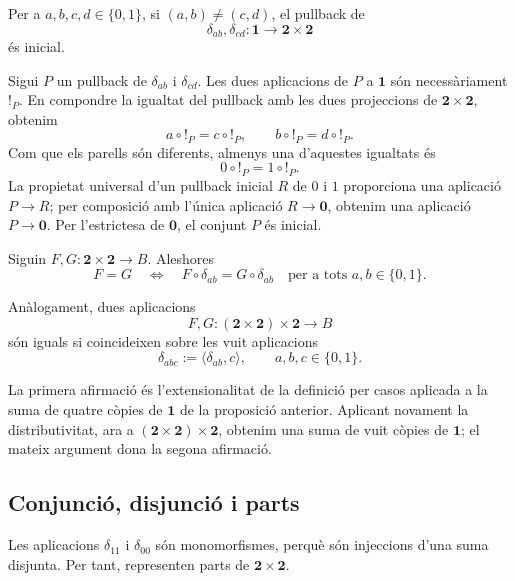 \begin{proposicio}\label{prop:delta-disjuntes}
Per a \(a,b,c,d\in\{0,1\}\), si \((a,b)\neq(c,d)\), el pullback de
\[
\delta_{ab},\delta_{cd}:\mathbf1\to\mathbf2\times\mathbf2
\]
és inicial.
\end{proposicio}

\begin{prova}
Sigui \(P\) un pullback de \(\delta_{ab}\) i \(\delta_{cd}\). Les dues aplicacions de \(P\) a \(\mathbf1\) són necessàriament \({!}_P\). En compondre la igualtat del pullback amb les dues projeccions de \(\mathbf2\times\mathbf2\), obtenim
\[
a\circ {!}_P=c\circ {!}_P,
\qquad
b\circ {!}_P=d\circ {!}_P.
\]
Com que els parells són diferents, almenys una d'aquestes igualtats és
\[
0\circ {!}_P=1\circ {!}_P.
\]
La propietat universal d'un pullback inicial \(R\) de \(0\) i \(1\) proporciona una aplicació \(P\to R\); per composició amb l'única aplicació \(R\to\mathbf0\), obtenim una aplicació \(P\to\mathbf0\). Per l'estrictesa de \(\mathbf0\), el conjunt \(P\) és inicial.
\end{prova}

\begin{proposicio}\label{prop:extensionalitat-taules}
Siguin \(F,G:\mathbf2\times\mathbf2\to B\). Aleshores
\[
F=G
\quad\Longleftrightarrow\quad
F\circ\delta_{ab}=G\circ\delta_{ab}
\quad
\text{per a tots }a,b\in\{0,1\}.
\]

Anàlogament, dues aplicacions
\[
F,G:(\mathbf2\times\mathbf2)\times\mathbf2\to B
\]
són iguals si coincideixen sobre les vuit aplicacions
\[
\delta_{abc}:=\langle\delta_{ab},c\rangle,
\qquad a,b,c\in\{0,1\}.
\]
\end{proposicio}

\begin{prova}
La primera afirmació és l'extensionalitat de la definició per casos
aplicada a la suma de quatre còpies de \(\mathbf1\) de la proposició
anterior. Aplicant novament la distributivitat, ara a
\((\mathbf2\times\mathbf2)\times\mathbf2\), obtenim una suma de vuit
còpies de \(\mathbf1\); el mateix argument dona la segona afirmació.
\end{prova}

\subsection{Conjunció, disjunció i parts}

Les aplicacions \(\delta_{11}\) i \(\delta_{00}\) són
monomorfismes, perquè són injeccions d'una suma disjunta.
Per tant, representen parts de \(\mathbf2\times\mathbf2\).

